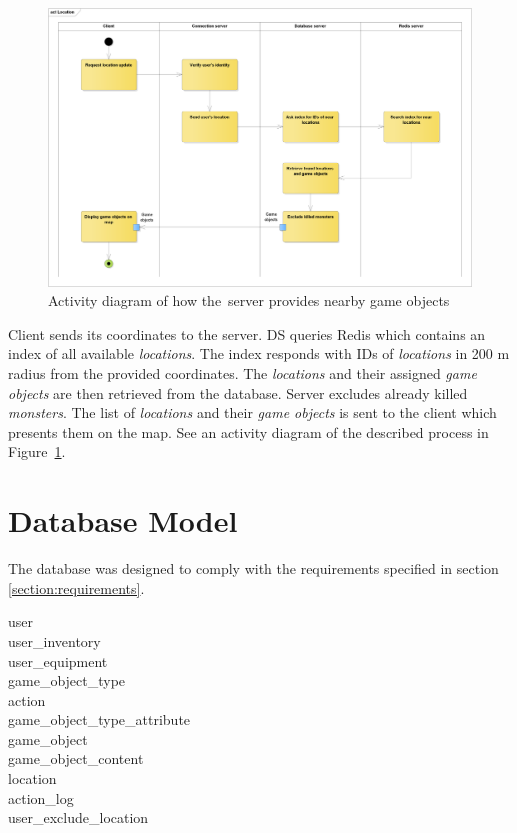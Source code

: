 	\begin{figure}[h]	
		\includegraphics[width=\textwidth]{figures/AD_Location}
		\centering			
		\caption{Activity diagram of how the~server provides nearby game objects}
		\label{fig:adlocation}
	\end{figure} 
	
	Client sends its coordinates to the server. DS queries Redis which contains an index of all available \textit{locations}. The index responds with IDs of \textit{locations} in 200 m radius from the provided coordinates. The \textit{locations} and their assigned \textit{game objects} are then retrieved from the database. Server excludes already killed \textit{monsters}. The list of \textit{locations} and their \textit{game objects} is sent to the client which presents them on the map. See an activity diagram of the described process in Figure~\ref{fig:adlocation}.		

\section{Database Model}
	The database was designed to comply with the requirements specified in section \ref{section:requirements}.
	\begin{description}
		\item[user]
		\item[user\_inventory]
		\item[user\_equipment]
		\item[game\_object\_type]
		\item[action]
		\item[game\_object\_type\_attribute]
		\item[game\_object]
		\item[game\_object\_content]
		\item[location]
		\item[action\_log]
		\item[user\_exclude\_location]
	\end{description}

